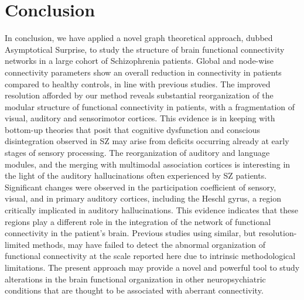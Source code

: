 \section{Conclusion}
In conclusion, we have applied a novel graph theoretical approach, dubbed Asymptotical Surprise, to study the structure of brain functional connectivity networks in a large cohort of Schizophrenia patients.
Global and node-wise connectivity parameters show an overall reduction in connectivity in patients compared to healthy controls, in line with previous studies.
The improved resolution afforded by our method reveals substantial reorganization of the modular structure of functional connectivity in patients, with a fragmentation of visual, auditory and sensorimotor cortices.
This evidence is in keeping with bottom-up theories that posit that cognitive dysfunction and conscious disintegration observed in SZ may arise from deficits occurring already at early stages of sensory processing.
The reorganization of auditory and language modules, and the merging with multimodal association cortices is interesting in the light of the auditory hallucinations often experienced by SZ patients.
Significant changes were observed in the participation coefficient of sensory, visual, and in primary auditory cortices, including the Heschl gyrus, a region critically implicated in auditory hallucinations.
This evidence indicates that these regions play a different role in the integration of the network of functional connectivity in the patient’s brain.
Previous studies using similar, but resolution-limited methods, may have failed to detect the abnormal organization of functional connectivity at the scale reported here due to intrinsic methodological limitations.
The present approach may provide a novel and powerful tool to study alterations in the brain functional organization in other neuropsychiatric conditions that are thought to be associated with aberrant connectivity.


